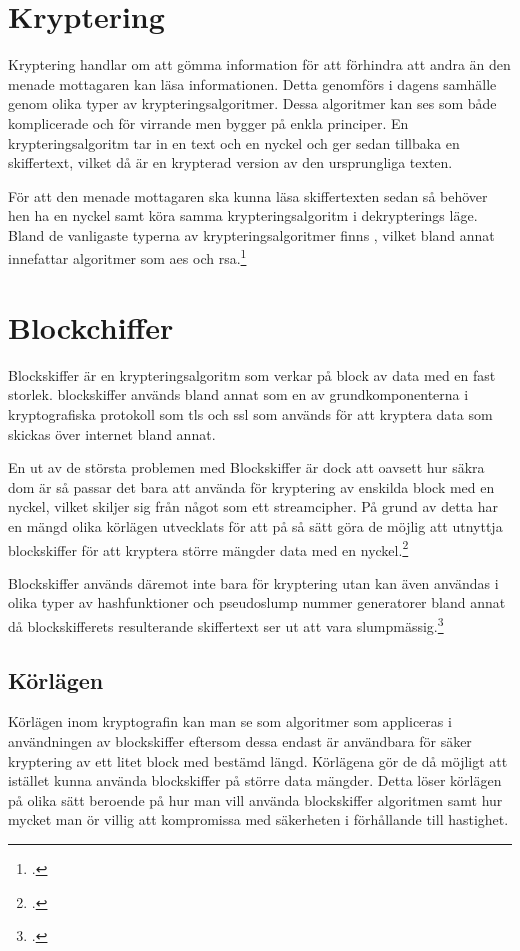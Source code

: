 
\section{Kryptering}
Kryptering handlar om att gömma information för att förhindra att andra än den menade mottagaren kan läsa informationen.
Detta genomförs i dagens samhälle genom olika typer av krypteringsalgoritmer. Dessa algoritmer kan ses som både komplicerade
och för virrande men bygger på enkla principer. En krypteringsalgoritm tar in en text och en nyckel och ger sedan tillbaka en
skiffertext, vilket då är en krypterad version av den ursprungliga texten.

För att den menade mottagaren ska kunna läsa skiffertexten sedan så behöver hen ha en nyckel samt köra samma krypteringsalgoritm
i dekrypterings läge. Bland de vanligaste typerna av krypteringsalgoritmer finns ,
vilket bland annat innefattar algoritmer som \acrshort{aes} och \gls{rsa}.\footcite{kryptering}

\section{Blockchiffer}
Blockskiffer är en krypteringsalgoritm som verkar på block av data med en fast storlek.
blockskiffer används bland annat som en av grundkomponenterna i kryptografiska protokoll som \acrfull{tls} och \acrfull{ssl}
som används för att kryptera data som skickas över internet bland annat.

En ut av de största problemen med Blockskiffer är dock att oavsett hur säkra dom är så passar det bara att använda
för kryptering av enskilda block med en nyckel, vilket skiljer sig från något som ett \gls{streamcipher}.
På grund av detta har en mängd olika körlägen utvecklats för att på så sätt göra de möjlig att utnyttja
blockskiffer för att kryptera större mängder data med en nyckel.\footcite{blockskiffer-ref}

Blockskiffer används däremot inte bara för kryptering utan kan även användas i olika typer av \gls{hashfunktion}er  %
och \gls{pseudoslump} nummer generatorer bland annat då blockskifferets resulterande skiffertext ser ut att vara slumpmässig.\footcite{blockskiffer-ref}

\subsection{Körlägen}
Körlägen inom kryptografin kan man se som algoritmer som appliceras i användningen av
blockskiffer eftersom dessa endast är användbara för säker kryptering av ett litet block med bestämd längd.
Körlägena gör de då möjligt att istället kunna använda blockskiffer på större data mängder.
Detta löser körlägen på olika sätt beroende på hur man vill använda blockskiffer algoritmen samt hur
mycket man ör villig att kompromissa med säkerheten i förhållande till hastighet.

